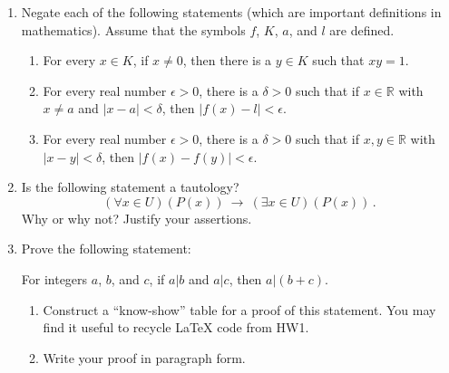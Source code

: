 \documentclass[12pt]{article}
\newcommand{\RR}{{\mathbb R}}
\begin{document}
\begin{enumerate}
\item  Negate each of the following statements (which are important definitions in mathematics).
  Assume that the symbols $f$, $K$, $a$, and $l$ are defined.
  \begin{enumerate}

    \item  For every $x\in K$, if $x\neq 0$, then there is a $y\in K$ such that $xy=1$.
    \item  For every real number $\epsilon >0$, there is a $\delta>0$ such that if $x\in\RR$ with $x\neq a$ and $|x-a|<\delta$, then
      $|f(x)-l|<\epsilon$. 
    \item   For every real number $\epsilon >0$, there is a $\delta>0$ such that if $x,y\in\RR$ with $|x-y|<\delta$, then
      $|f(x)-f(y)|<\epsilon$. 

  \end{enumerate}


\item Is the following statement a tautology?
  \[
     (\forall x\in U) (P(x))\ \longrightarrow\ (\exists x\in U)(P(x))\,.
  \]
  Why or why not?
  Justify your assertions.

\newpage
\item Prove the following statement:

     For integers $a$, $b$, and $c$, if $a|b$ and $a|c$, then $a|(b+c)$.
  \begin{enumerate}
  \item  Construct a ``know-show'' table for a proof of this statement.
         You may find it useful to recycle LaTeX code from HW1.
   \item  Write your proof in paragraph form.  
  \end{enumerate}


\end{enumerate}
\end{document}
